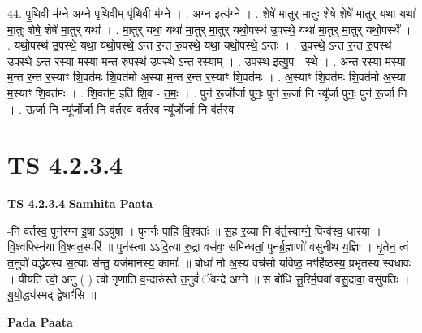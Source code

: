\documentclass[17pt]{extarticle}
\begin{document}
44. पृ॒थि॒वी म॑ग्ने अग्ने पृथि॒वीम् पृ॑थि॒वी म॑ग्ने । . अ॒ग्न॒ इत्य॑ग्ने । . शेषे॑ मा॒तुर् मा॒तुः शेषे॒ शेषे॑ मा॒तुर् यथा॒ यथा॑ मा॒तुः शेषे॒ शेषे॑ मा॒तुर् यथा᳚ । . मा॒तुर् यथा॒ यथा॑ मा॒तुर् मा॒तुर् यथो॒पस्थ॑ उ॒पस्थे॒ यथा॑ मा॒तुर् मा॒तुर् यथो॒पस्थे᳚ । . यथो॒पस्थ॑ उ॒पस्थे॒ यथा॒ यथो॒पस्थे॒ ऽन्त र॒न्त रु॒पस्थे॒ यथा॒ यथो॒पस्थे॒ ऽन्तः । . उ॒पस्थे॒ ऽन्त र॒न्त रु॒पस्थ॑ उ॒पस्थे॒ ऽन्त र॒स्या म॒स्या म॒न्त रु॒पस्थ॑ उ॒पस्थे॒ ऽन्त र॒स्याम् । . उ॒पस्थ॒ इत्यु॒प - स्थे॒ । . अ॒न्त र॒स्या म॒स्या म॒न्त र॒न्त र॒स्याꣳ शि॒वत॑मः शि॒वत॑मो अ॒स्या म॒न्त र॒न्त र॒स्याꣳ शि॒वत॑मः । . अ॒स्याꣳ शि॒वत॑मः शि॒वत॑मो अ॒स्या म॒स्याꣳ शि॒वत॑मः । . शि॒वत॑म॒ इति॑ शि॒व - त॒मः॒ । . पुन॑ रू॒र्जोर्जा पुनः॒ पुन॑ रू॒र्जा नि न्यू᳚र्जा पुनः॒ पुन॑ रू॒र्जा नि । . ऊ॒र्जा नि न्यू᳚र्जोर्जा नि व॑र्तस्व वर्तस्व॒ न्यू᳚र्जोर्जा नि व॑र्तस्व । \newline
\pagebreak
{}

\section{ TS 4.2.3.4 }

\textbf{TS 4.2.3.4 } \newline
\textbf{Samhita Paata} \newline

-नि व॑र्तस्व॒ पुन॑रग्न इ॒षा ऽऽयु॑षा । पुन॑र्नः पाहि वि॒श्वतः॑ ॥ स॒ह र॒य्या नि व॑र्त॒स्वाग्ने॒ पिन्व॑स्व॒ धार॑या । वि॒श्वफ्स्नि॑या वि॒श्वत॒स्परि॑ ॥ पुन॑स्त्वा ऽऽदि॒त्या रु॒द्रा वस॑वः॒ समि॑न्धतां॒ पुन॑र्ब्र॒ह्माणो॑ वसुनीथ य॒ज्ञिः । घृ॒तेन॒ त्वं त॒नुवो॑ वर्द्धयस्व स॒त्याः स॑न्तु॒ यज॑मानस्य॒ कामाः᳚ ॥ बोधा॑ नो अ॒स्य वच॑सो यविष्ठ॒ मꣳहि॑ष्ठस्य॒ प्रभृ॑तस्य स्वधावः । पीय॑ति त्वो॒ अनु॑ ( ) त्वो गृणाति व॒न्दारु॑स्ते त॒नुवं॑ ॅवन्दे अग्ने ॥ स बो॑धि सू॒रिर्म॒घवा॑ वसु॒दावा॒ वसु॑पतिः । यु॒यो॒द्ध्य॑स्मद् द्वेषाꣳ॑सि ॥ \newline

\textbf{Pada Paata} \newline
\end{document}
